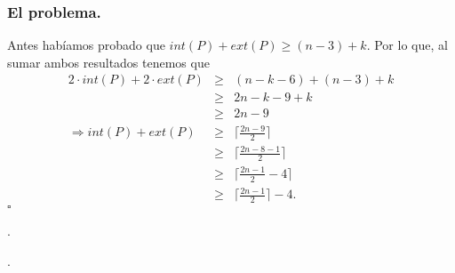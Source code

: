 \begin{frame}
  \frametitle{El problema.}
  Antes habíamos probado que $int(P) + ext(P) \geq (n - 3) + k$. Por lo que, al sumar ambos resultados
  tenemos que
  \begin{eqnarray*}
    2\cdot int(P) + 2 \cdot ext(P) &\geq& (n - k - 6) + (n - 3) + k\\
    &\geq& 2n - k - 9 + k\\
    &\geq& 2n - 9 \\
    \Rightarrow int(P) + ext(P) &\geq& \big\lceil \frac{2n - 9}{2} \big\rceil\\
    &\geq& \big\lceil \frac{2n - 8 - 1}{2} \big\rceil\\
    &\geq& \big\lceil \frac{2n - 1}{2} - 4 \big\rceil\\
    &\geq& \big\lceil \frac{2n - 1}{2}\big\rceil - 4.
  \end{eqnarray*}
  \hfill $\square$\newline

  .\newline

  .
\end{frame}
